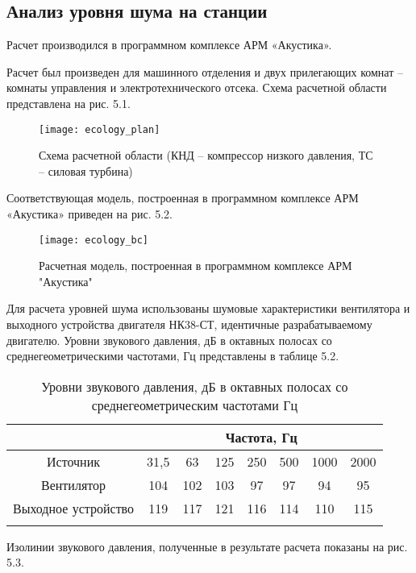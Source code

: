 \subsection{Анализ уровня шума на станции} %
\label{sub:ecology_noise_analisys}

Расчет производился в программном комплексе АРМ «Акустика».

Расчет был произведен для машинного отделения и двух прилегающих комнат – комнаты управления и электротехнического отсека. Схема расчетной области представлена на рис. 5.1.

\begin{figure}[H]
	\centering
	\texttt{[image: ecology\_plan]}
	\caption{Схема расчетной области (КНД – компрессор низкого давления, ТС – силовая турбина)}
\end{figure}

Соответствующая модель, построенная в программном комплексе АРМ «Акустика» приведен на рис. 5.2.

\begin{figure}[H]
	\centering
	\texttt{[image: ecology\_bc]}
	\caption{Расчетная модель, построенная в программном комплексе АРМ "Акустика"}
\end{figure}

Для расчета уровней шума использованы шумовые характеристики вентилятора и выходного устройства двигателя НК38-СТ, идентичные разрабатываемому двигателю. Уровни звукового давления, дБ в октавных полосах со среднегеометрическими частотами, Гц  представлены в таблице 5.2.

\begin{samepage}
	\begin{longtable}{|c|c|c|c|c|c|c|c|}
		\hline
		\multicolumn{1}{|c}{}& \multicolumn{7}{c|}{Частота, Гц} \\ \hline
		Источник & 31,5 & 63 & 125 & 250 & 500 & 1000 & 2000 \\ \hline
		Вентилятор & 104 & 102 & 103 & 97 & 97 & 94 & 95 \\ \hline
		Выходное устройство & 119 & 117 & 121 & 116 & 114 & 110 & 115 \\ \hline
		\caption{Уровни звукового давления, дБ в октавных полосах со среднегеометрическим частотами Гц} \label{tab:ecology_noise_power}
	\end{longtable}
\end{samepage}

Изолинии звукового давления, полученные в результате расчета показаны на рис. 5.3.

